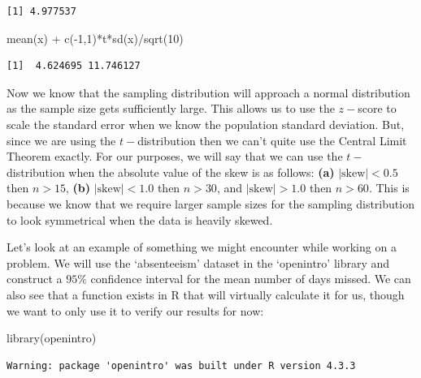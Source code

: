\documentclass[
  letterpaper,
  DIV=11,
  numbers=noendperiod]{scrreprt}
\newenvironment{Shaded}{\begin{snugshade}}{\end{snugshade}}
\newcommand{\DecValTok}[1]{\textcolor[rgb]{0.68,0.00,0.00}{#1}}
\newcommand{\FunctionTok}[1]{\textcolor[rgb]{0.28,0.35,0.67}{#1}}
\newcommand{\NormalTok}[1]{\textcolor[rgb]{0.00,0.23,0.31}{#1}}
\newcommand{\SpecialCharTok}[1]{\textcolor[rgb]{0.37,0.37,0.37}{#1}}
\begin{document}
\begin{verbatim}
[1] 4.977537
\end{verbatim}

\begin{Shaded}
\begin{Highlighting}[]
\FunctionTok{mean}\NormalTok{(x) }\SpecialCharTok{+} \FunctionTok{c}\NormalTok{(}\SpecialCharTok{{-}}\DecValTok{1}\NormalTok{,}\DecValTok{1}\NormalTok{)}\SpecialCharTok{*}\NormalTok{t}\SpecialCharTok{*}\FunctionTok{sd}\NormalTok{(x)}\SpecialCharTok{/}\FunctionTok{sqrt}\NormalTok{(}\DecValTok{10}\NormalTok{)}
\end{Highlighting}
\end{Shaded}

\begin{verbatim}
[1]  4.624695 11.746127
\end{verbatim}

Now we know that the sampling distribution will approach a normal
distribution as the sample size gets sufficiently large. This allows us
to use the \(z-\)score to scale the standard error when we know the
population standard deviation. But, since we are using the
\(t-\)distribution then we can't quite use the Central Limit Theorem
exactly. For our purposes, we will say that we can use the
\(t-\)distribution when the absolute value of the skew is as follows:
\textbf{(a)} \(|\text{skew}|< 0.5\) then \(n>15\), \textbf{(b)}
\(|\text{skew}|< 1.0\) then \(n>30\), and \(|\text{skew}|> 1.0\) then
\(n>60\). This is because we know that we require larger sample sizes
for the sampling distribution to look symmetrical when the data is
heavily skewed.

Let's look at an example of something we might encounter while working
on a problem. We will use the `absenteeism' dataset in the `openintro'
library and construct a \(95\%\) confidence interval for the mean number
of days missed. We can also see that a function exists in R that will
virtually calculate it for us, though we want to only use it to verify
our results for now:

\begin{Shaded}
\begin{Highlighting}[]
\FunctionTok{library}\NormalTok{(openintro)}
\end{Highlighting}
\end{Shaded}

\begin{verbatim}
Warning: package 'openintro' was built under R version 4.3.3
\end{verbatim}
\end{document}
